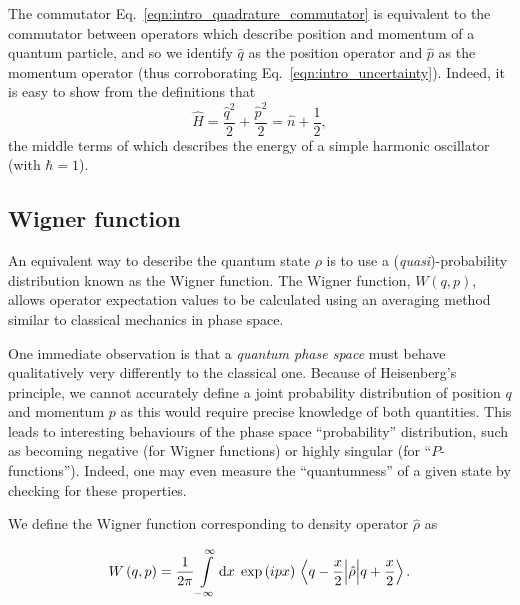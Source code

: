 The commutator Eq.~\ref{eqn:intro_quadrature_commutator} is equivalent to the commutator between operators which describe position and momentum of a quantum particle, and so we identify $\hat{q}$ as the position operator and $\hat{p}$ as the momentum operator (thus corroborating Eq.~\ref{eqn:intro_uncertainty}). Indeed, it is easy to show from the definitions that
\begin{equation}
\hat{H} = \frac{\hat{q}^2}{2} + \frac{\hat{p}^2}{2} = \hat{n} + \frac{1}{2} ,
\end{equation}
the middle terms of which describes the energy of a simple harmonic oscillator (with $\hbar = 1$).





\FloatBarrier
\subsection{Wigner function}
An equivalent way to describe the quantum state $\rho$ is to use a (\emph{quasi})-probability distribution known as the Wigner function. The Wigner function, $W\left(q, p\right)$, allows operator expectation values to be calculated using an averaging method similar to classical mechanics in phase space. %

One immediate observation is that a \emph{quantum phase space} must behave qualitatively very differently to the classical one. Because of Heisenberg's principle, we cannot accurately define a joint probability distribution of position $q$ and momentum $p$ as this would require precise knowledge of both quantities. This leads to interesting behaviours of the phase space ``probability'' distribution, such as becoming negative (for Wigner functions) or highly singular (for ``$P$-functions''). Indeed, one may even measure the ``quantumness'' of a given state by checking for these properties.

We define the Wigner function corresponding to density operator $\hat{\rho}$ as \cite{Leonhardt2010}

\begin{equation}\label{eqn:intro_wigners_formula}
W\left(q, p\right) = \frac{1}{2 \pi} \int\limits_{-\infty}^{\infty} \mathrm{d}x \; \exp\left(i p x\right) \mel{q - \frac{x}{2}}{\hat{\rho}}{q + \frac{x}{2}}.
\end{equation}

